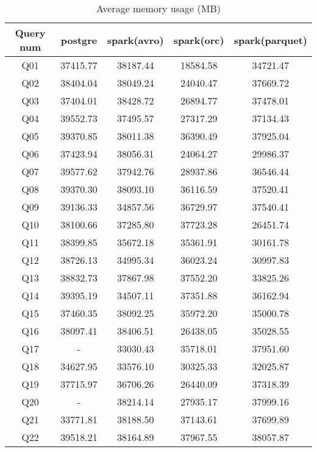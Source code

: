 \documentclass[../main.tex]{subfiles}
\begin{document}
    \begin{table}
        \begin{center}
            \begin{tabular}{ |c|c|c|c|c| } 
            \hline
            Query num & postgre & spark(avro) & spark(orc) & spark(parquet) \\
            \hline
            Q01 & 37415.77 & 38187.44 & 18584.58 & 34721.47\\
            Q02 & 38404.04 & 38049.24 & 24040.47 & 37669.72\\
            Q03 & 37404.01 & 38428.72 & 26894.77 & 37478.01\\
            Q04 & 39552.73 & 37495.57 & 27317.29 & 37134.43\\
            Q05 & 39370.85 & 38011.38 & 36390.49 & 37925.04\\
            Q06 & 37423.94 & 38056.31 & 24064.27 & 29986.37\\
            Q07 & 39577.62 & 37942.76 & 28937.86 & 36546.44\\
            Q08 & 39370.30 & 38093.10 & 36116.59 & 37520.41\\
            Q09 & 39136.33 & 34857.56 & 36729.97 & 37540.41\\
            Q10 & 38100.66 & 37285.80 & 37723.28 & 26451.74\\
            Q11 & 38399.85 & 35672.18 & 35361.91 & 30161.78\\
            Q12 & 38726.13 & 34995.34 & 36023.24 & 30997.83\\
            Q13 & 38832.73 & 37867.98 & 37552.20 & 33825.26\\
            Q14 & 39395.19 & 34507.11 & 37351.88 & 36162.94\\
            Q15 & 37460.35 & 38092.25 & 35972.20 & 35000.78\\
            Q16 & 38097.41 & 38406.51 & 26438.05 & 35028.55\\
            Q17 & - & 33030.43 & 35718.01 & 37951.60\\
            Q18 & 34627.95 & 33576.10 & 30325.33 & 32025.87\\
            Q19 & 37715.97 & 36706.26 & 26440.09 & 37318.39\\
            Q20 & - & 38214.14 & 27935.17 & 37999.16\\
            Q21 & 33771.81 & 38188.50 & 37143.61 & 37699.89\\
            Q22 & 39518.21 & 38164.89 & 37967.55 & 38057.87\\
            \hline
            \end{tabular}
            \\[1pt]
            \caption{Average memory usage (MB)}
        \end{center}
    \end{table}
\end{document}
